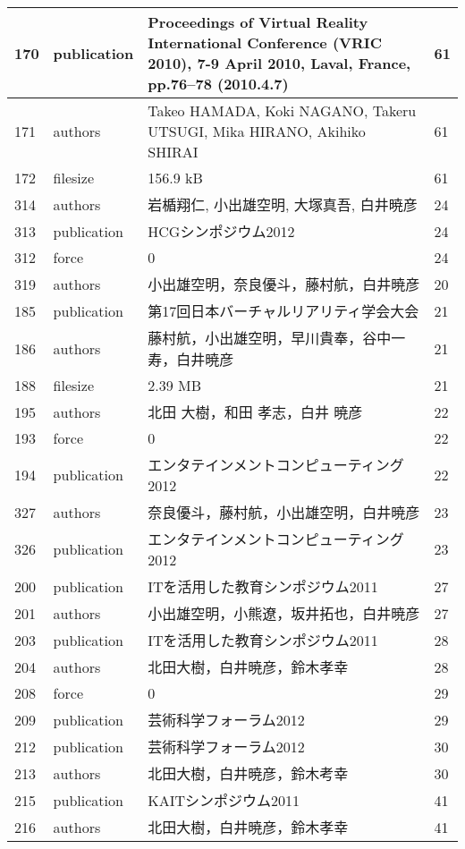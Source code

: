 \begin{longtable}{|l|l|l|l|}
170 & publication & Proceedings of Virtual Reality International Conference (VRIC 2010), 7-9 April 2010, Laval, France, pp.76–78 (2010.4.7) & 61 \\ \hline 
171 & authors & Takeo HAMADA, Koki NAGANO, Takeru UTSUGI, Mika HIRANO, Akihiko SHIRAI & 61 \\ \hline 
172 & filesize & 156.9 kB & 61 \\ \hline 
314 & authors & 岩楯翔仁, 小出雄空明, 大塚真吾, 白井暁彦 & 24 \\ \hline 
313 & publication & HCGシンポジウム2012 & 24 \\ \hline 
312 & force & 0 & 24 \\ \hline 
319 & authors & 小出雄空明，奈良優斗，藤村航，白井暁彦 & 20 \\ \hline 
185 & publication & 第17回日本バーチャルリアリティ学会大会 & 21 \\ \hline 
186 & authors & 藤村航，小出雄空明，早川貴奉，谷中一寿，白井暁彦 & 21 \\ \hline 
188 & filesize & 2.39 MB & 21 \\ \hline 
195 & authors & 北田 大樹，和田 孝志，白井 暁彦 & 22 \\ \hline 
193 & force & 0 & 22 \\ \hline 
194 & publication & エンタテインメントコンピューティング2012 & 22 \\ \hline 
327 & authors & 奈良優斗，藤村航，小出雄空明，白井暁彦 & 23 \\ \hline 
326 & publication & エンタテインメントコンピューティング2012 & 23 \\ \hline 
200 & publication & ITを活用した教育シンポジウム2011 & 27 \\ \hline 
201 & authors & 小出雄空明，小熊遼，坂井拓也，白井暁彦 & 27 \\ \hline 
203 & publication &  ITを活用した教育シンポジウム2011 & 28 \\ \hline 
204 & authors & 北田大樹，白井暁彦，鈴木孝幸 & 28 \\ \hline 
208 & force & 0 & 29 \\ \hline 
209 & publication & 芸術科学フォーラム2012 & 29 \\ \hline 
212 & publication & 芸術科学フォーラム2012 & 30 \\ \hline 
213 & authors & 北田大樹，白井暁彦，鈴木考幸 & 30 \\ \hline 
215 & publication & KAITシンポジウム2011 & 41 \\ \hline 
216 & authors & 北田大樹，白井暁彦，鈴木孝幸 & 41 \\ \hline 

\end{longtable}
